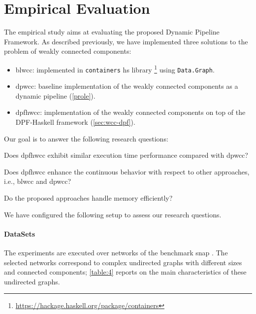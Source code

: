 \section{Empirical Evaluation}\label{sec:new:eval}
%
The empirical study aims at evaluating the proposed Dynamic Pipeline Framework. 
As described previously, we have implemented three solutions to the problem of weakly connected components:
\begin{itemize}
\item \acrshort{blwcc}: implemented in \texttt{containers} \acrshort{hs} library \footnote{\url{https://hackage.haskell.org/package/containers}} using \texttt{Data.Graph}.
\item \acrshort{dpwcc}: baseline implementation of the weakly connected components as a dynamic pipeline (\autoref{prole}).
\item \acrshort{dpfhwcc}: implementation of the weakly connected components on top of the DPF-Haskell framework (\autoref{sec:wcc-dpf}). 
\end{itemize}
Our goal is to answer the following research questions: 

\begin{inparaenum}[\bf {\bf RQ}1\upshape)]
\label{res:question}
    \item Does \acrshort{dpfhwcc} exhibit similar execution time performance compared with \acrshort{dpwcc}?
    \item Does \acrshort{dpfhwcc} enhance the continuous behavior with respect to other approaches, i.e., \acrshort{blwcc} and \acrshort{dpwcc}?
    \item Do the proposed approaches handle memory efficiently?
\end{inparaenum}

We have configured the following setup to assess our research questions. 

\paragraph{DataSets}\label{data:set}
The experiments are executed over networks of the benchmark \acrshort{snap} \cite{stanford}. The selected networks correspond to complex undirected graphs with different sizes and connected components; \autoref{table:4} reports on the main characteristics of these undirected graphs. 

